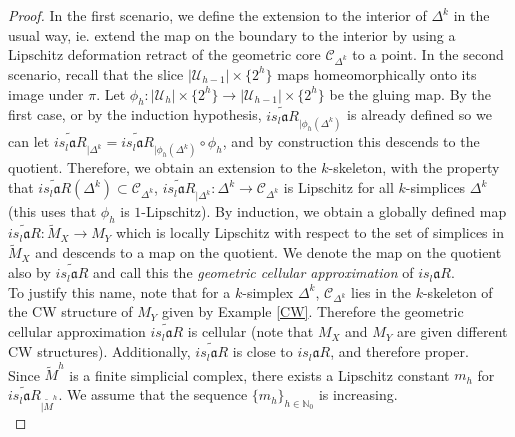 \documentclass[a4paper,11pt]{article}
\theoremstyle{definition}
\theoremstyle{plain}
\theoremstyle{remark}
\begin{document}
{\begin{proof}
In the first scenario, we define the extension to the interior of $\Delta^k$ in the usual way, ie. extend the map on the boundary to the interior by using a Lipschitz deformation retract of the geometric core $\mathscr{C}_{\Delta^k}$ to a point. In the second scenario, recall that the slice $|\mathcal{U}_{h-1}| \times \{2^h\}$ maps homeomorphically onto its image under $\pi$. Let $\phi_{h}: |\mathcal{U}_{h}| \times \{2^h\} \rightarrow |\mathcal{U}_{h-1}| \times \{2^h\}$ be the gluing map. By the first case, or by the induction hypothesis, $\widetilde{is_{l}\mathfrak{a}R}_{|\phi_{h}(\Delta^k)}$ is already defined so we can let $\widetilde{is_{l}\mathfrak{a}R}_{|\Delta^k} = \widetilde{is_{l}\mathfrak{a}R}_{|\phi_{h}(\Delta^k)} \circ \phi_{h}$, and by construction this descends to the quotient. Therefore, we obtain an extension to the $k$-skeleton, with the property that $\widetilde{is_{l}\mathfrak{a}R}(\Delta^{k}) \subset \mathscr{C}_{\Delta^{k}}$, $\widetilde{is_{l}\mathfrak{a}R}_{|\Delta^{k}}: \Delta^{k}\rightarrow \mathscr{C}_{\Delta^{k}}$ is Lipschitz for all $k$-simplices $\Delta^{k}$ (this uses that $\phi_{h}$ is $1$-Lipschitz). By induction, we obtain a globally defined map $\widetilde{is_{l}\mathfrak{a}R}: \tilde{M}_{X}\rightarrow M_{Y}$ which is locally Lipschitz with respect to the set of simplices in $\tilde{M}_{X}$ and descends to a map on the quotient. We denote the map on the quotient also by $\widetilde{is_{l}\mathfrak{a}R}$ and call this the \textit{geometric cellular approximation} of $is_{l}\mathfrak{a}R$.\\

To justify this name, note that for a $k$-simplex $\Delta^k$, $\mathscr{C}_{\Delta^k}$ lies in the $k$-skeleton of the CW structure of $M_{Y}$ given by Example \ref{CW}. Therefore the geometric cellular approximation $\widetilde{is_{l}\mathfrak{a}R}$ is cellular (note that $M_{X}$ and $M_{Y}$ are given different CW structures). Additionally, $\widetilde{is_{l}\mathfrak{a}R}$ is close to $is_{l}\mathfrak{a}R$, and therefore proper. \\

Since $\tilde{M}^h$ is a finite simplicial complex, there exists a Lipschitz constant $m_{h}$ for $\widetilde{is_{l}\mathfrak{a}R}_{|\tilde{M}^h}$. We assume that the sequence $\{m_{h}\}_{h\in \mathbb{N}_{0}}$ is increasing. \\


\end{proof}}
\end{document}
